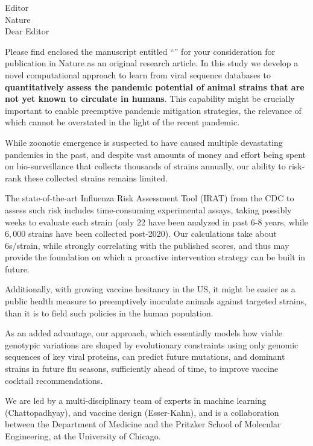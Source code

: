 \documentclass[9pt,onecolumn,compsoc]{IEEEtran}
\newcommand{\Space}{\vspace{10pt}}
\def\EDITOR{Editor}
\def\BEDITOR{Editor\xspace}
\def\JNAME{Proceedings of the National Academy of Sciences \xspace}
\def\JNAME{Nature \xspace}
\def\JADDR{}
\begin{document}
\parskip=12pt
\parindent=0pt
\Space
\Space
\fontsize{11}{12}\selectfont
\Space
\Space

 \EDITOR\\
 \JNAME\\

Dear \BEDITOR  

Please find enclosed the  manuscript entitled ``\textbf{\TITLE}'' for your consideration for publication in \JNAME as an original research article. In this study we develop a novel computational approach to learn from viral sequence databases to \textbf{quantitatively assess the pandemic potential of animal strains that are not yet known to circulate in humans}. This capability might be  crucially important to enable preemptive pandemic mitigation strategies, the relevance of which cannot be overstated in the light of the recent pandemic.

While zoonotic emergence is suspected to have caused multiple devastating pandemics in the past, and despite vast amounts of money and effort being spent on bio-surveillance that collects thousands of strains annually, our ability to risk-rank these collected strains remains limited.

The state-of-the-art Influenza Risk Assessment Tool (IRAT) from the CDC to assess such risk includes time-consuming experimental assays, taking possibly weeks to evaluate each strain (only 22 have been analyzed in past 6-8 years, while $6,000$ strains have been collected post-2020). Our calculations take about 6s/strain, while strongly correlating with the published scores, and thus may provide the foundation on which a proactive intervention strategy can be built in future.

Additionally, with growing vaccine hesitancy in the US, it might be easier as a public health measure to preemptively inoculate animals against targeted strains, than it is to field such policies in the human population.

As an added advantage, our approach, which essentially models  how viable genotypic variations are shaped by evolutionary constraints using only genomic sequences  of key viral proteins, can predict future mutations, and dominant strains in future flu seasons, sufficiently ahead of time,  to improve vaccine cocktail recommendations.


We are led by a multi-disciplinary team  of experts in  machine learning (Chattopadhyay), and vaccine design (Esser-Kahn), and is a collaboration between the Department of Medicine and the Pritzker School of Molecular Engineering, at the University of Chicago.
 
\end{document}
